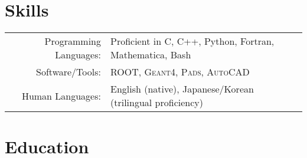 \documentclass[10pt]{article} %
\begin{document}

\section{Skills}

\noindent\begin{tabularx}{\linewidth}{@{}rl}
	\addlinespace[5pt]


	Programming Languages: & Proficient in C, C++, Python, Fortran, Mathematica, Bash\\


	Software/Tools: & \textsc{ROOT}, \textsc{Geant4}, \textsc{Pads}, \textsc{AutoCAD}\\


	Human Languages: & English (native), Japanese/Korean (trilingual proficiency)\\


\end{tabularx}


\section{Education}
\end{document}
